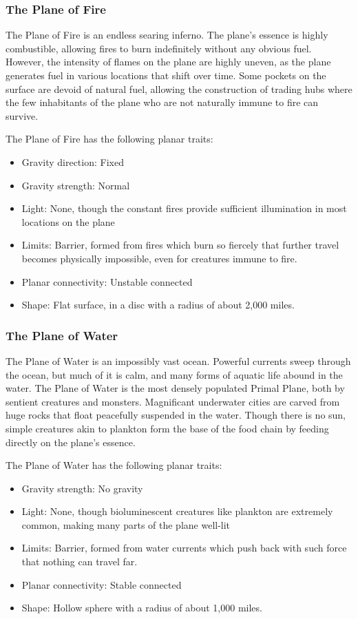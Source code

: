     \subsubsection{The Plane of Fire}
      The Plane of Fire is an endless searing inferno.
      The plane's essence is highly combustible, allowing fires to burn indefinitely without any obvious fuel.
      However, the intensity of flames on the plane are highly uneven, as the plane generates fuel in various locations that shift over time.
      Some pockets on the surface are devoid of natural fuel, allowing the construction of trading hubs where the few inhabitants of the plane who are not naturally immune to fire can survive.

      The Plane of Fire has the following planar traits:
      \begin{itemize}
        \item Gravity direction: Fixed
        \item Gravity strength: Normal
        \item Light: None, though the constant fires provide sufficient illumination in most locations on the plane
        \item Limits: Barrier, formed from fires which burn so fiercely that further travel becomes physically impossible, even for creatures immune to fire.
        \item Planar connectivity: Unstable connected
        \item Shape: Flat surface, in a disc with a radius of about 2,000 miles.
      \end{itemize}

    \subsubsection{The Plane of Water}
      The Plane of Water is an impossibly vast ocean.
      Powerful currents sweep through the ocean, but much of it is calm, and many forms of aquatic life abound in the water.
      The Plane of Water is the most densely populated Primal Plane, both by sentient creatures and monsters.
      Magnificant underwater cities are carved from huge rocks that float peacefully suspended in the water.
      Though there is no sun, simple creatures akin to plankton form the base of the food chain by feeding directly on the plane's essence.

      The Plane of Water has the following planar traits:
      \begin{itemize}
        \item Gravity strength: No gravity
        \item Light: None, though bioluminescent creatures like plankton are extremely common, making many parts of the plane well-lit
        \item Limits: Barrier, formed from water currents which push back with such force that nothing can travel far.
        \item Planar connectivity: Stable connected
        \item Shape: Hollow sphere with a radius of about 1,000 miles.
      \end{itemize}


